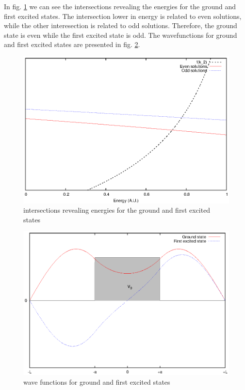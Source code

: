 \documentclass{article}
\begin{document}
In fig. \ref{ex_1_3_ground_energies} we can see the intersections revealing the energies for the ground and first excited states. The intersection lower in energy is related to even solutions, while the other interesection is related to odd solutions. Therefore, the ground state is even while the first excited state is odd. The wavefunctions for ground and first excited states are presented in fig. \ref{ex_1_3_psi}.

\begin{figure}
\centering
\includegraphics{ex_1_3_ground_energies.eps}
\caption{intersections revealing energies for the ground and first excited states}
\label{ex_1_3_ground_energies}
\end{figure}

\begin{figure}
\centering
\includegraphics{ex_1_3_psi.eps}
\caption{wave functions for ground and first excited states}
\label{ex_1_3_psi}
\end{figure}
\end{document}
